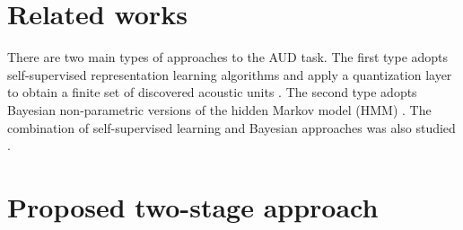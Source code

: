 \documentclass[a4paper]{article}
\begin{document}
\section{Related works}
\label{sec:related_works}
There are two main types of approaches to  the AUD task. The first type adopts  self-supervised representation learning algorithms and apply a quantization layer to obtain a finite set of discovered acoustic units \cite{oord2017neural,baevski2020vqwav2vec,Niekerk2020vector}. The second type adopts Bayesian non-parametric versions of the hidden Markov model (HMM) \cite{lee2012a,Ondel2019Bayesian,Yusuf2020hierarchical}. The combination of self-supervised learning and Bayesian approaches was also studied \cite{Ebbers2017,Glarner2018Full,ondel2018bayesian}.




\section{Proposed two-stage approach}
\end{document}
